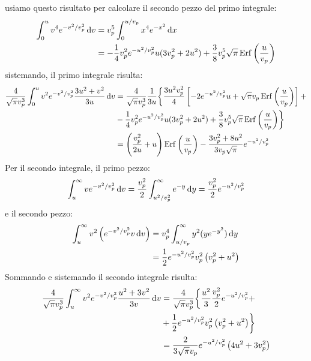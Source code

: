 usiamo questo risultato per calcolare il secondo pezzo del primo integrale:
\begin{equation}
	\begin{aligned}
		\int_0^u v^4 e^{-v^2/v_p^2}\,\mathrm{d} v & = v_p^5\int_0^{u/v_p} x^4 e^{-x^2}\,\mathrm{d} x                                                                  \\
		                                   & =-\frac{1}{4}v_p^2 e^{-u^2/v_p^2} u(3v_p^2+2 u^2)+\frac{3}{8}v_p^5\sqrt{\pi}\operatorname{Erf}\left(\frac{u}{v_p}\right)
	\end{aligned}
\end{equation}
sistemando, il primo integrale risulta:
\begin{equation}
	\begin{aligned}
		\frac{4}{\sqrt{\pi}v_p^3}\int_0^u v^2 e^{-v^2/v_p^2}\frac{3u^2+v^2}{3u}\,\mathrm{d} v & =  \frac{4}{\sqrt{\pi}v_p^3}\frac{1}{3u}\biggl\{\frac{3u^2 v_p^2}{4}\left[-2 e^{-u^2/v_p^2} u+\sqrt{\pi}v_p\operatorname{Erf}\left(\frac{u}{v_p}\right)\right] + \\
		                                                                               & -\frac{1}{4}v_p^2 e^{-u^2/v_p^2} u(3v_p^2+2 u^2)+\frac{3}{8}v_p^5\sqrt{\pi}\operatorname{Erf}\left(\frac{u}{v_p}\right) \biggr\}                                 \\
		                                                                               & =\left(\frac{v_p^2}{2 u} + u\right) \operatorname{Erf}\left(\frac{u}{v_p}\right)-\frac{3 v_p^2 + 8 u^2}{3 v_p \sqrt{\pi}}e^{-u^2/v_p^2}
	\end{aligned}
\end{equation}
Per il secondo integrale, il primo pezzo:
\begin{equation}
	\int_u^\infty v e^{-v^2/v_p^2}\,\mathrm{d} v = \frac{v_p^2}{2}\int_{u^2/v_p^2}^\infty e^{-y}\,\mathrm{d} y = \frac{v_p^2}{2}e^{-u^2/v_p^2}
\end{equation}
e il secondo pezzo:
\begin{equation}
	\begin{aligned}
		\int_u^\infty v^2\left(e^{-v^2/v_p^2} v \,\mathrm{d} v\right) & = v_p^4\int_{u/v_p}^{\infty} y^2 (y e^{-y^2})\,\mathrm{d} y  \\
		                                                       & =\frac{1}{2}e^{-u^2/v_p^2}v_p^2\left(v_p^2+u^2\right)
	\end{aligned}
\end{equation}
Sommando e sistemando il secondo integrale risulta:
\begin{equation}
	\begin{aligned}
		\frac{4}{\sqrt{\pi}v_p^3}\int_u^\infty v^2 e^{-v^2/v_p^2}\frac{u^2+3v^2}{3v}\,\mathrm{d} v & = \frac{4}{\sqrt{\pi}v_p^3}\biggl\{\frac{u^2}{3} \frac{v_p^2}{2}e^{-u^2/v_p^2} + \\
		                                                                                    & +\frac{1}{2}e^{-u^2/v_p^2}v_p^2\left(v_p^2+u^2\right)\biggr\}                    \\
		                                                                                    & =\frac{2}{3\sqrt{\pi}v_p}e^{-u^2/v_p^2}\left(4u^2+3v_p^2\right)
	\end{aligned}
\end{equation}
